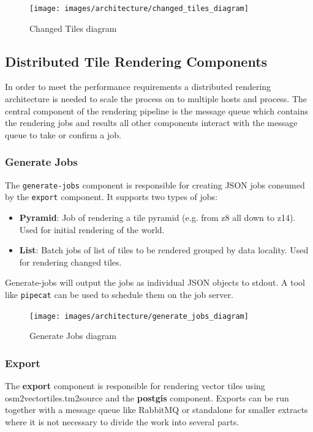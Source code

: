 \begin{figure}[H]
  \centering
  \texttt{[image: images/architecture/changed\_tiles\_diagram]}
  \caption{Changed Tiles diagram}
\end{figure}

\subsection{Distributed Tile Rendering Components}

In order to meet the performance requirements a distributed rendering architecture 
is needed to scale the process on to multiple hosts and process. The central component of the rendering pipeline is the message queue which contains the rendering jobs and results all other components interact with the message queue to take or confirm a job.

\subsubsection{Generate Jobs}

The \texttt{generate-jobs} component is responsible for creating JSON jobs consumed by the \texttt{export} component. It supports two types of jobs:

\begin{itemize}
  \item \textbf{Pyramid}: Job of rendering a tile pyramid (e.g. from z8 all down to z14). Used for initial rendering of the world.
  \item \textbf{List}: Batch jobs of list of tiles to be rendered grouped by data locality. Used for rendering changed tiles.
\end{itemize}

Generate-jobs will output the jobs as individual JSON objects to stdout. A tool like \texttt{pipecat} can be used to schedule them on the job server.

\begin{figure}[H]
  \centering
  \texttt{[image: images/architecture/generate\_jobs\_diagram]}
  \caption{Generate Jobs diagram}
\end{figure}
\clearpage

\subsubsection{Export}

The \textbf{export} component is responsible for rendering vector tiles using osm2vectortiles.tm2source and the \textbf{postgis} component. Exports can be run together with a message queue like RabbitMQ or standalone for smaller extracts where it is not necessary to divide the work into several parts.

